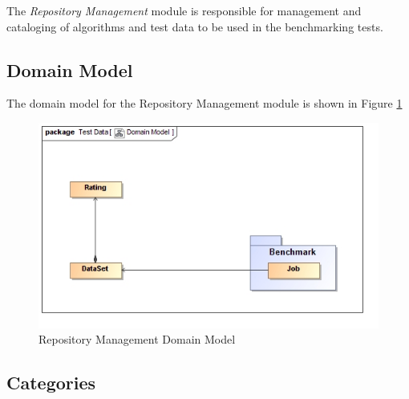 The \textit{Repository Management} module is responsible for management and cataloging of
algorithms and test data to be used in the benchmarking tests.

\subsection{Domain Model}
The domain model for the Repository Management module is shown in Figure \ref{fig:testDataModel}
\begin{figure}[H]
  \begin{center}
  \includegraphics[scale=0.5]{../Diagrams and Charts/Test Data/Domain Model.jpg}  
  \caption{Repository Management Domain Model}
  \end{center}
  \label{fig:testDataModel}
\end{figure}

\subsection{Categories}

